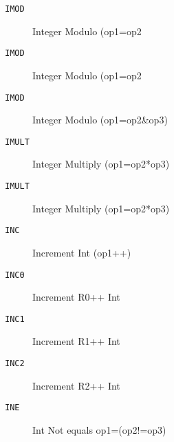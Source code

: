 
\begin{description}
\item[\texttt{IMOD       }]  Integer Modulo (op1=op2%
\end{description}

\begin{description}
\item[\texttt{IMOD       }]  Integer Modulo (op1=op2%
\end{description}

\begin{description}
\item[\texttt{IMOD       }]  Integer Modulo (op1=op2\&op3)\\
\end{description}

\begin{description}
\item[\texttt{IMULT      }]  Integer Multiply (op1=op2*op3)\\
\end{description}

\begin{description}
\item[\texttt{IMULT      }]  Integer Multiply (op1=op2*op3)\\
\end{description}

\begin{description}
\item[\texttt{INC        }]  Increment Int (op1++)\\
\end{description}

\begin{description}
\item[\texttt{INC0       }]  Increment R0++ Int\\
\end{description}

\begin{description}
\item[\texttt{INC1       }]  Increment R1++ Int\\
\end{description}

\begin{description}
\item[\texttt{INC2       }]  Increment R2++ Int\\
\end{description}

\begin{description}
\item[\texttt{INE        }]  Int Not equals op1=(op2!=op3)\\
\end{description}
